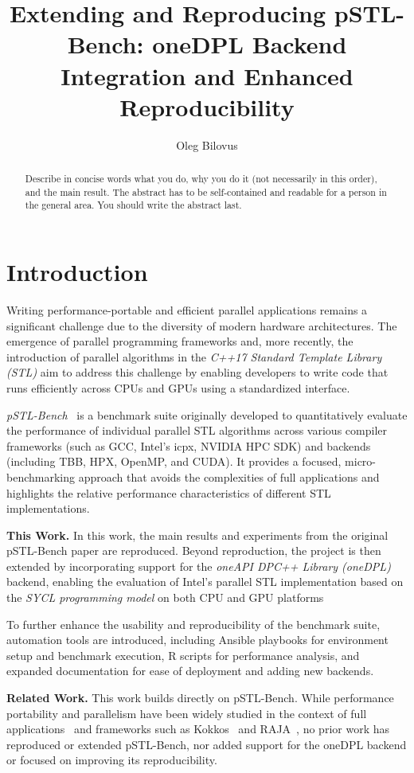 \documentclass[sigconf]{acmart}
\title{Extending and Reproducing pSTL-Bench: oneDPL Backend Integration and Enhanced Reproducibility}
\author{Oleg Bilovus}
\affiliation{
  \institution{Department of Computer Science, University of Salerno}
  \city{Fisciano (SA)}
  \country{Italy}
}
\newcommand{\mypar}[1]{{\bf #1.}}
\begin{document}
\begin{abstract}
  Describe in concise words what you do, why you do it (not necessarily
  in this order), and the main result.  The abstract has to be
  self-contained and readable for a person in the general area. You
  should write the abstract last.
\end{abstract}

\maketitle

\section{Introduction}\label{sec:intro}
Writing performance-portable and efficient parallel applications remains a
significant challenge due to the diversity of modern hardware architectures.
The emergence of parallel programming frameworks and, more recently, the
introduction of parallel algorithms in the \textit{C++17 Standard Template
  Library (STL)} aim to address this challenge by enabling developers to write
code that runs efficiently across CPUs and GPUs using a standardized interface.

\textit{pSTL-Bench}~\cite{pSTL-Bench} is a benchmark suite originally developed to
quantitatively evaluate the performance of individual parallel STL algorithms
across various compiler frameworks (such as GCC, Intel's icpx, NVIDIA HPC SDK)
and backends (including TBB, HPX, OpenMP, and CUDA). It provides a focused,
micro-benchmarking approach that avoids the complexities of full applications
and highlights the relative performance characteristics of different STL
implementations.

\mypar{This Work} In this work, the main results and experiments from the original pSTL-Bench
paper are reproduced. Beyond reproduction, the project is then extended by
incorporating support for the \textit{oneAPI DPC++ Library (oneDPL)} backend,
enabling the evaluation of Intel’s parallel STL implementation based on the
\textit{SYCL programming model} on both CPU and GPU platforms

To further enhance the usability and reproducibility of the benchmark suite,
automation tools are introduced, including Ansible playbooks for environment
setup and benchmark execution, R scripts for performance analysis, and expanded
documentation for ease of deployment and adding new backends.

\mypar{Related Work} This work builds directly on pSTL-Bench.
While performance portability and parallelism have been widely studied in
the context of full applications~\cite{app} and frameworks such as Kokkos~\cite{Kokkos}
and RAJA~\cite{RAJA}, no prior work has reproduced or extended pSTL-Bench,
nor added support for the oneDPL backend or focused on improving its reproducibility.
\end{document}
